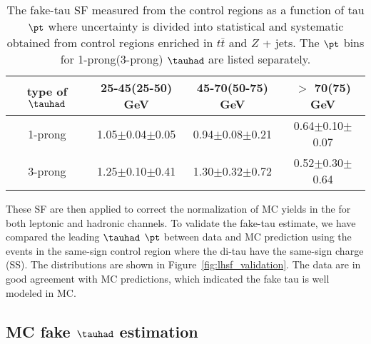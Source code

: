 \begin{table}[htb]
\caption{ The fake-tau SF measured from the control regions as a function of tau $\pt$ where uncertainty is divided into statistical and 
systematic obtained from control regions enriched in $t\bar t$ and $Z$ + jets. The $\pt$ bins for 1-prong(3-prong) $\tauhad$ are listed separately.}
\centering
\begin{tabular}{|c|c|c|c|} \hline
type of $\tauhad$  & 25-45(25-50) GeV & 45-70(50-75) GeV  & $>$ 70(75) GeV \\ \hline
1-prong & 1.05$\pm$0.04$\pm$0.05 & 0.94$\pm$0.08$\pm$0.21 & 0.64$\pm$0.10$\pm$0.07 \\
3-prong & 1.25$\pm$0.10$\pm$0.41 & 1.30$\pm$0.32$\pm$0.72 & 0.52$\pm$0.30$\pm$0.64 \\ \hline
\end{tabular}
\label{tab:faketauSF}
\end{table}

These SF are then applied to correct the normalization of MC yields in the for both leptonic and hadronic channels. 
To validate the fake-tau estimate, we have compared the leading $\tauhad$ $\pt$ between data and MC prediction using the events in 
the same-sign control region where the di-tau have the same-sign charge (SS).
The distributions are shown in Figure~\ref{fig:lhsf_validation}. The data are in good agreement with MC predictions, 
which indicated the fake tau is well modeled in MC. 

\subsection{MC fake $\tauhad$ estimation}
\label{sec:sf_method}

